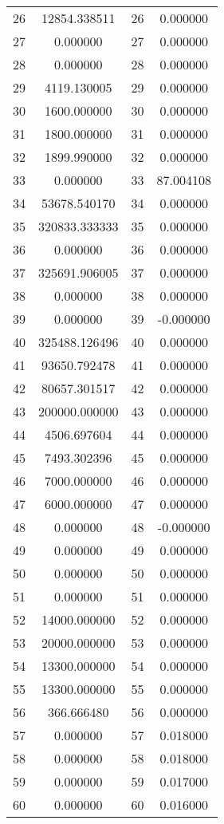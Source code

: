 \documentclass[12pt]{article}
\begin{document}
\begin{longtable}{@{}cccc@{}}
26 & 12854.338511 & 26 & 0.000000 \\
27 & 0.000000 & 27 & 0.000000 \\
28 & 0.000000 & 28 & 0.000000 \\
29 & 4119.130005 & 29 & 0.000000 \\
30 & 1600.000000 & 30 & 0.000000 \\
31 & 1800.000000 & 31 & 0.000000 \\
32 & 1899.990000 & 32 & 0.000000 \\
33 & 0.000000 & 33 & 87.004108 \\
34 & 53678.540170 & 34 & 0.000000 \\
35 & 320833.333333 & 35 & 0.000000 \\
36 & 0.000000 & 36 & 0.000000 \\
37 & 325691.906005 & 37 & 0.000000 \\
38 & 0.000000 & 38 & 0.000000 \\
39 & 0.000000 & 39 & -0.000000 \\
40 & 325488.126496 & 40 & 0.000000 \\
41 & 93650.792478 & 41 & 0.000000 \\
42 & 80657.301517 & 42 & 0.000000 \\
43 & 200000.000000 & 43 & 0.000000 \\
44 & 4506.697604 & 44 & 0.000000 \\
45 & 7493.302396 & 45 & 0.000000 \\
46 & 7000.000000 & 46 & 0.000000 \\
47 & 6000.000000 & 47 & 0.000000 \\
48 & 0.000000 & 48 & -0.000000 \\
49 & 0.000000 & 49 & 0.000000 \\
50 & 0.000000 & 50 & 0.000000 \\
51 & 0.000000 & 51 & 0.000000 \\
52 & 14000.000000 & 52 & 0.000000 \\
53 & 20000.000000 & 53 & 0.000000 \\
54 & 13300.000000 & 54 & 0.000000 \\
55 & 13300.000000 & 55 & 0.000000 \\
56 & 366.666480 & 56 & 0.000000 \\
57 & 0.000000 & 57 & 0.018000 \\
58 & 0.000000 & 58 & 0.018000 \\
59 & 0.000000 & 59 & 0.017000 \\
60 & 0.000000 & 60 & 0.016000 \\

\end{longtable}
\end{document}
